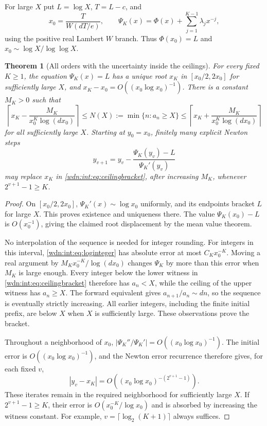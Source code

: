 \documentclass[11pt,letterpaper]{article}
\newtheorem{theorem}{Theorem}[section]
\theoremstyle{remark}\newtheorem{remark}[theorem]{Remark}
\begin{document}
For large $X$ put $L=\log X$, $T=L-c$, and
\begin{equation}\label{wdn:int:eq:x0}
 x_0=\frac{T}{W(dT/e)},\qquad
 \Psi_K(x)=\Phi(x)+\sum_{j=1}^{K-1}\lambda_jx^{-j},
\end{equation}
using the positive real Lambert $W$ branch. Thus $\Phi(x_0)=L$ and
$x_0\sim\log X/\log\log X$.

\begin{theorem}[All orders with the uncertainty inside the ceilings]\label{wdn:int:thm:inverse}
For every fixed $K\ge1$, the equation $\Psi_K(x)=L$ has a unique root
$x_K$ in $[x_0/2,2x_0]$ for sufficiently large $X$, and
$x_K-x_0=O((x_0\log x_0)^{-1})$. There is a constant $M_K>0$ such that
\begin{equation}\label{wdn:int:eq:ceilingbracket}
 \left\lceil x_K-\frac{M_K}{x_0^K\log(dx_0)}\right\rceil
 \le N(X):=\min\{n:a_n\ge X\}
 \le\left\lceil x_K+\frac{M_K}{x_0^K\log(dx_0)}\right\rceil
\end{equation}
for all sufficiently large $X$.
Starting at $y_0=x_0$, finitely many explicit Newton steps
\begin{equation}\label{wdn:int:eq:Newtoninverse}
 y_{v+1}=y_v-\frac{\Psi_K(y_v)-L}{\Psi_K'(y_v)}
\end{equation}
may replace $x_K$ in \eqref{wdn:int:eq:ceilingbracket}, after increasing $M_K$,
whenever $2^{v+1}-1\ge K$.
\end{theorem}
\begin{proof}
On $[x_0/2,2x_0]$, $\Psi_K'(x)\sim\log x_0$ uniformly, and its endpoints
bracket $L$ for large $X$. This proves existence and uniqueness there.
The value $\Psi_K(x_0)-L$ is $O(x_0^{-1})$, giving the claimed root
displacement by the mean value theorem.

No interpolation of the sequence is needed for integer rounding.
For integers in this interval, \eqref{wdn:int:eq:loginteger} has absolute error
at most $C_Kx_0^{-K}$. Moving a real argument by
$M_Kx_0^{-K}/\log(dx_0)$ changes $\Psi_K$ by more than this error when
$M_K$ is large enough. Every integer below the lower witness in
\eqref{wdn:int:eq:ceilingbracket} therefore has $a_n<X$, while the ceiling of the
upper witness has $a_n\ge X$. The forward equivalent gives
$a_{n+1}/a_n\sim dn$, so the sequence is eventually strictly increasing.
All earlier integers, including the finite initial prefix, are below
$X$ when $X$ is sufficiently large. These observations prove the bracket.

Throughout a neighborhood of $x_0$,
$|\Psi_K''/\Psi_K'|=O((x_0\log x_0)^{-1})$.
The initial error is $O((x_0\log x_0)^{-1})$, and the Newton error
recurrence therefore gives, for each fixed $v$,
\begin{equation}\label{wdn:int:eq:Newtonerror}
 |y_v-x_K|=O\left((x_0\log x_0)^{-(2^{v+1}-1)}\right).
\end{equation}
These iterates remain in the required neighborhood for sufficiently large
$X$. If $2^{v+1}-1\ge K$, their error is
$O(x_0^{-K}/\log x_0)$ and is absorbed by increasing the witness constant.
For example, $v=\lceil\log_2(K+1)\rceil$ always suffices.
\end{proof}
\end{document}

